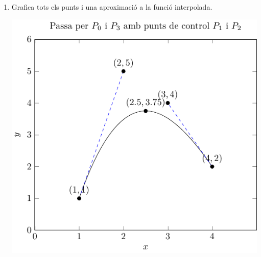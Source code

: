 \begin{enumerate}
  \item Grafica tots els punts i una aproximació a la funció interpolada.

  \begin{center}
  \includegraphics{../figures/interpolaciobeziers2.pdf}
  \end{center}

\end{enumerate}